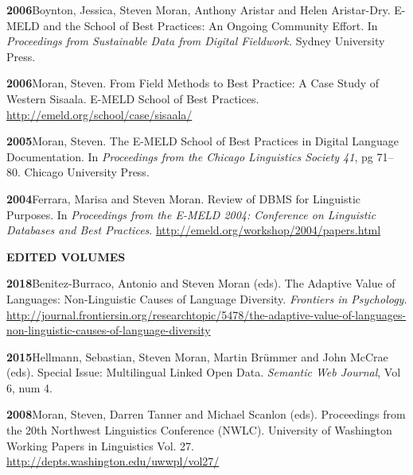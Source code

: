 \documentclass[11pt]{article}
\newcommand{\hangpara}{
 \setlength{\parindent}{0in} %
 \hangindent=0.42in %
}
\begin{document}
\vskip 6pt
\hangpara
{\bf 2006}\hspace{1ex}Boynton, Jessica, Steven Moran, Anthony Aristar and Helen Aristar-Dry. E-MELD and the School of Best Practices: An Ongoing Community Effort. In {\it Proceedings from Sustainable Data from Digital Fieldwork.} Sydney University Press. %

\vskip 6pt
\hangpara
{\bf 2006}\hspace{1ex}Moran, Steven. From Field Methods to Best Practice: A Case Study of Western Sisaala. E-MELD School of Best Practices. \url{http://emeld.org/school/case/sisaala/}

\vskip 6pt
\hangpara
{\bf 2005}\hspace{1ex}Moran, Steven. The E-MELD School of Best Practices in Digital Language Documentation. In {\it Proceedings from the Chicago Linguistics Society 41}, pg 71--80. Chicago University Press. 


\vskip 6pt
\hangpara
{\bf 2004}\hspace{1ex}Ferrara, Marisa and Steven Moran. Review of DBMS for Linguistic Purposes. In {\it Proceedings from the E-MELD 2004: Conference on Linguistic Databases and Best Practices}. \url{http://emeld.org/workshop/2004/papers.html}

\vskip 20pt
\begin{flushleft}
{\bf EDITED VOLUMES}
\end{flushleft}

\hangpara
{\bf 2018}\hspace{1ex}Benitez-Burraco, Antonio and Steven Moran (eds). The Adaptive Value of Languages: Non-Linguistic Causes of Language Diversity. {\it Frontiers in Psychology}. \url{http://journal.frontiersin.org/researchtopic/5478/the-adaptive-value-of-languages-non-linguistic-causes-of-language-diversity}

\hangpara
\vskip 6pt
{\bf 2015}\hspace{1ex}Hellmann, Sebastian, Steven Moran, Martin Br{\"u}mmer and John McCrae (eds). Special Issue: Multilingual Linked Open Data. {\it Semantic Web Journal}, Vol 6, num 4.

\vskip 6pt
\hangpara
{\bf 2008}\hspace{1ex}Moran, Steven, Darren Tanner and Michael Scanlon (eds). Proceedings from the 20th Northwest Linguistics Conference (NWLC). University of Washington Working Papers in Linguistics Vol. 27. \url{http://depts.washington.edu/uwwpl/vol27/}
\end{document}
